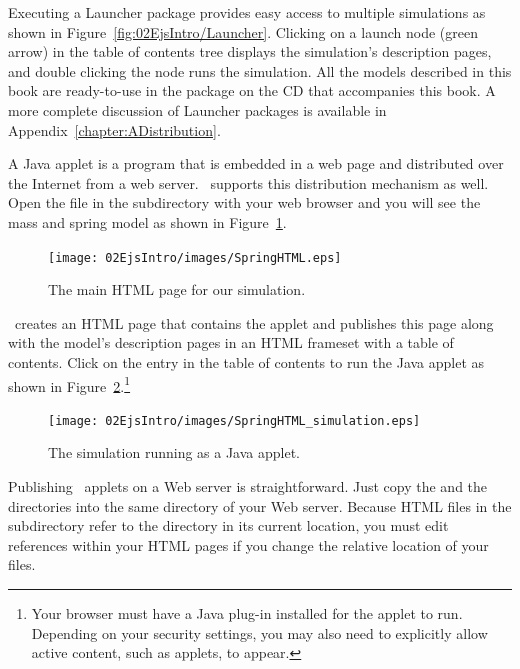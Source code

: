 Executing a Launcher package provides easy access to multiple simulations as shown in Figure~\ref{fig:02EjsIntro/Launcher}.  Clicking on a launch node (green arrow) in the table of contents tree displays the simulation's description pages, and double clicking the node runs the simulation.  All the models described in this book are ready-to-use in the  package on the CD that accompanies this book.  A more complete discussion of Launcher packages is available in Appendix~\ref{chapter:ADistribution}.

A Java applet is a program that is embedded in a web page and distributed over the Internet from a web server. \Ejs\ supports this distribution mechanism as well. Open the  file in the  subdirectory with your web browser and you will see the mass and spring model as shown in Figure~\ref{fig:02EjsIntro/SpringHTML}.

\begin{figure}[htb]
    \centering
  \texttt{[image: 02EjsIntro/images/SpringHTML.eps]}
    \caption{The main HTML page for our simulation.}
    \label{fig:02EjsIntro/SpringHTML}
\end{figure}

\ejs\ creates an HTML page that contains the applet and publishes this page along with the model's description pages in an HTML frameset with a table of contents. Click on the  entry in the table of contents to run the Java applet as shown in Figure~\ref{fig:02EjsIntro/SpringHTML_simulation}.\footnote{Your browser must have a Java plug-in installed for the applet to run. Depending on your security settings, you may also need to explicitly allow active content, such as applets, to appear.}

\begin{figure}[htb]
    \centering
  \texttt{[image: 02EjsIntro/images/SpringHTML\_simulation.eps]}
    \caption{The simulation running as a Java applet.}
    \label{fig:02EjsIntro/SpringHTML_simulation}
\end{figure}

Publishing \ejs\ applets on a Web server is straightforward. Just copy the  and the  directories into the same directory of your Web server. Because HTML files in the  subdirectory refer to the  directory in its current location, you must edit references within your HTML pages if you change the relative location of your files.

